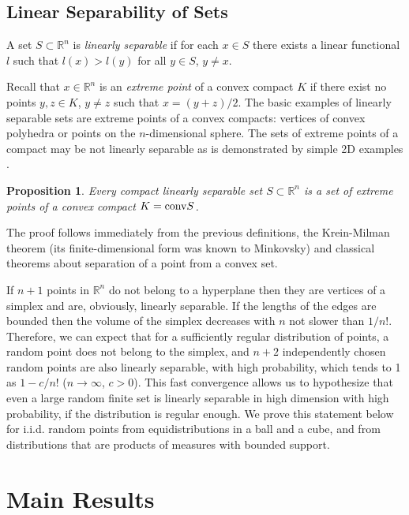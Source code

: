 \documentclass[final,5p,times,twocolumn]{elsarticle}
\newtheorem{prop}{Proposition}
\newenvironment{definition}[1][Definition]{\begin{trivlist}
\item[\hskip \labelsep {\bfseries #1}]}{\end{trivlist}}
\begin{document}
\subsection{Linear Separability of Sets}

\begin{definition}A set $S \subset \mathbb{R}^n$ is {\em linearly separable} if for each $x\in S$ there exists a linear functional $l$ such that $l(x)>l(y)$ for all $y\in S$, $y\neq x$.
\end{definition}
Recall that $x \in \mathbb{R}^n$ is an {\em extreme point} of a convex compact $K$ if there exist no points $y,z\in K$, $y\neq z$ such that $x=(y+z)/2$. The basic examples of linearly separable sets are  extreme points of a convex compacts: vertices of convex polyhedra or points  on the $n$-dimensional sphere. The sets of extreme points of a compact may be not linearly separable  as is demonstrated by simple 2D examples \citep{Simon2011}.

\begin{prop}Every compact linearly separable set $S \subset \mathbb{ R}^n$ is a set of extreme points of a convex compact $K={\rm conv} S$.
\end{prop}
The proof follows immediately from the previous definitions, the Krein-Milman theorem \citep{Simon2011} (its finite-dimensional form was known to Minkovsky) and classical theorems about separation of a point from a convex set.

If $n+1$ points in $\mathbb{R}^n$ do not belong to a hyperplane then they are vertices of a simplex and are, obviously, linearly separable. If the lengths of the edges are bounded then the volume of the simplex decreases with $n$ not slower than $1/n!$. Therefore, we can expect that for a sufficiently regular distribution of points, a random point does not belong to the simplex, and $n+2$ independently chosen random points are also linearly separable, with high probability, which tends to 1 as $1-c/n!$ ($n\to \infty$, $ c>0$).  This fast convergence allows us to hypothesize that even a large random finite set is linearly separable in high dimension with high probability, if the distribution is regular enough.  We prove this statement below for i.i.d. random points from equidistributions in a ball and a cube, and from distributions that are products of measures with bounded support.


\section{Main Results}
\end{document}
